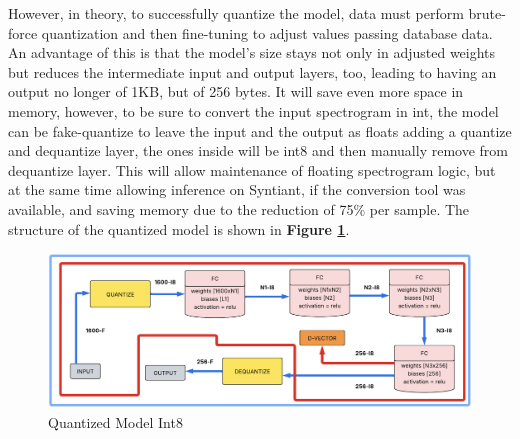 However, in theory, to successfully quantize the model, data must perform brute-force quantization and then fine-tuning to adjust values passing database data. An advantage of this is that the model's size stays not only in adjusted weights but reduces the intermediate input and output layers, too, leading to having an output no longer of 1KB, but of 256 bytes. It will save even more space in memory, however, to be sure to convert the input spectrogram in int, the model can be fake-quantize to leave the input and the output as floats adding a quantize and dequantize layer, the ones inside will be int8 and then manually remove from dequantize layer. This will allow maintenance of floating spectrogram logic, but at the same time allowing inference on Syntiant, if the conversion tool was available, and saving memory due to the reduction of 75\% per sample. The structure of the quantized model is shown in \textbf{Figure \ref{fig:quantized model int8}}.
\begin{center}
\begin{figure}[!h]
        \centering
        \includegraphics[width=1.0\textwidth]{images/3.05 Quantized Model Int8.png}
        \caption{Quantized Model Int8}
        \label{fig:quantized model int8}
    \end{figure}
\end{center}
\newpage
